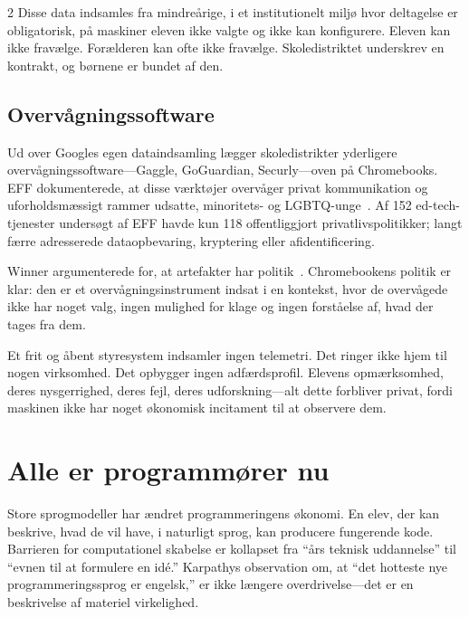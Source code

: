 \documentclass[11pt, a4paper]{article}
\begin{document}
\begin{multicols}{2}
Disse data indsamles fra mindreårige, i et institutionelt miljø hvor deltagelse er obligatorisk, på maskiner eleven ikke valgte og ikke kan konfigurere. Eleven kan ikke fravælge. Forælderen kan ofte ikke fravælge. Skoledistriktet underskrev en kontrakt, og børnene er bundet af den.

\subsection{Overvågningssoftware}

Ud over Googles egen dataindsamling lægger skoledistrikter yderligere overvågningssoftware---Gaggle, GoGuardian, Securly---oven på Chromebooks. EFF dokumenterede, at disse værktøjer overvåger privat kommunikation og uforholdsmæssigt rammer udsatte, minoritets- og LGBTQ-unge~\citep{eff2024monitoring}. Af 152 ed-tech-tjenester undersøgt af EFF havde kun 118 offentliggjort privatlivspolitikker; langt færre adresserede dataopbevaring, kryptering eller afidentificering.

Winner argumenterede for, at artefakter har politik~\citep{winner1980artifacts}. Chromebookens politik er klar: den er et overvågningsinstrument indsat i en kontekst, hvor de overvågede ikke har noget valg, ingen mulighed for klage og ingen forståelse af, hvad der tages fra dem.

Et frit og åbent styresystem indsamler ingen telemetri. Det ringer ikke hjem til nogen virksomhed. Det opbygger ingen adfærdsprofil. Elevens opmærksomhed, deres nysgerrighed, deres fejl, deres udforskning---alt dette forbliver privat, fordi maskinen ikke har noget økonomisk incitament til at observere dem.


\section{Alle er programmører nu}

Store sprogmodeller har ændret programmering\-ens økonomi. En elev, der kan beskrive, hvad de vil have, i naturligt sprog, kan producere fungerende kode. Barrieren for computationel skabelse er kollapset fra ``års teknisk uddannelse'' til ``evnen til at formulere en idé.'' Karpathys observation om, at ``det hotteste nye programmeringssprog er engelsk,'' er ikke længere overdrivelse---det er en beskrivelse af materiel virkelighed.


\end{multicols}
\end{document}
